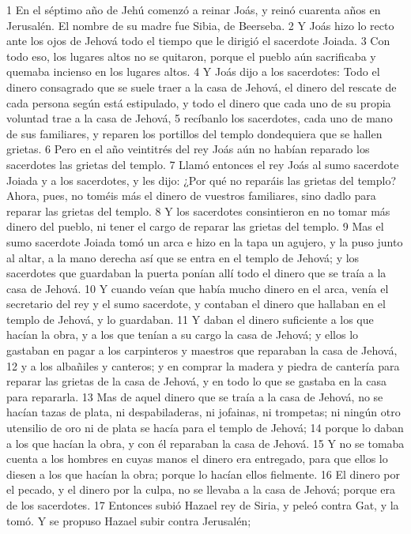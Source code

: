 1 En el séptimo año de Jehú comenzó a reinar Joás, y reinó cuarenta años en Jerusalén. El nombre de su madre fue Sibia, de Beerseba.
2 Y Joás hizo lo recto ante los ojos de Jehová todo el tiempo que le dirigió el sacerdote Joiada.
3 Con todo eso, los lugares altos no se quitaron, porque el pueblo aún sacrificaba y quemaba incienso en los lugares altos.
4 Y Joás dijo a los sacerdotes: Todo el dinero consagrado que se suele traer a la casa de Jehová, el dinero del rescate de cada persona según está estipulado, y todo el dinero que cada uno de su propia voluntad trae a la casa de Jehová,
5 recíbanlo los sacerdotes, cada uno de mano de sus familiares, y reparen los portillos del templo dondequiera que se hallen grietas.
6 Pero en el año veintitrés del rey Joás aún no habían reparado los sacerdotes las grietas del templo.
7 Llamó entonces el rey Joás al sumo sacerdote Joiada y a los sacerdotes, y les dijo: ¿Por qué no reparáis las grietas del templo? Ahora, pues, no toméis más el dinero de vuestros familiares, sino dadlo para reparar las grietas del templo.
8 Y los sacerdotes consintieron en no tomar más dinero del pueblo, ni tener el cargo de reparar las grietas del templo.
9 Mas el sumo sacerdote Joiada tomó un arca e hizo en la tapa un agujero, y la puso junto al altar, a la mano derecha así que se entra en el templo de Jehová; y los sacerdotes que guardaban la puerta ponían allí todo el dinero que se traía a la casa de Jehová.
10 Y cuando veían que había mucho dinero en el arca, venía el secretario del rey y el sumo sacerdote, y contaban el dinero que hallaban en el templo de Jehová, y lo guardaban.
11 Y daban el dinero suficiente a los que hacían la obra, y a los que tenían a su cargo la casa de Jehová; y ellos lo gastaban en pagar a los carpinteros y maestros que reparaban la casa de Jehová,
12 y a los albañiles y canteros; y en comprar la madera y piedra de cantería para reparar las grietas de la casa de Jehová, y en todo lo que se gastaba en la casa para repararla.
13 Mas de aquel dinero que se traía a la casa de Jehová, no se hacían tazas de plata, ni despabiladeras, ni jofainas, ni trompetas; ni ningún otro utensilio de oro ni de plata se hacía para el templo de Jehová;
14 porque lo daban a los que hacían la obra, y con él reparaban la casa de Jehová.
15 Y no se tomaba cuenta a los hombres en cuyas manos el dinero era entregado, para que ellos lo diesen a los que hacían la obra; porque lo hacían ellos fielmente.
16 El dinero por el pecado, y el dinero por la culpa, no se llevaba a la casa de Jehová; porque era de los sacerdotes. 
17 Entonces subió Hazael rey de Siria, y peleó contra Gat, y la tomó. Y se propuso Hazael subir contra Jerusalén;
